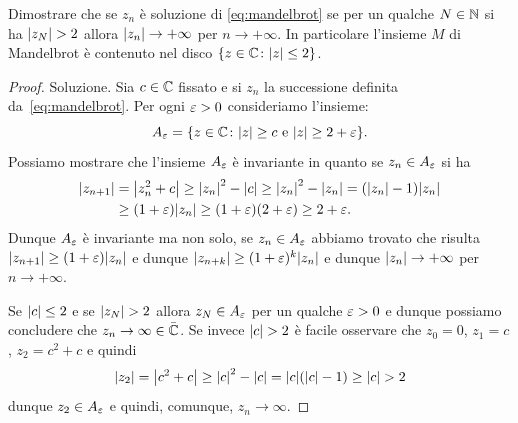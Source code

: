 \begin{exercise}
Dimostrare che se $z_n$ è soluzione di \eqref{eq:mandelbrot}
se per un qualche $N\in \mathbb N$ si ha ${\left|z_N\right|}> 2$ allora ${\left|z_n\right|}\to +\infty$
per $n\to +\infty$. In particolare l'insieme $M$ di Mandelbrot
è contenuto nel disco ${\left\{ z\in \mathbb C \colon {\left|z\right|}\le 2 \right\}}$.
\end{exercise}
%
\begin{proof}{Soluzione.}
Sia $c\in \mathbb C$ fissato e si $z_n$ la successione definita da~\eqref{eq:mandelbrot}.
Per ogni $\varepsilon>0$ consideriamo l'insieme:
\[
  A_\varepsilon = {\left\{ z \in \mathbb C \colon {\left|z\right|}\ge c \text{ e } {\left|z\right|}\ge 2+\varepsilon \right\}}.
\]
Possiamo mostrare che l'insieme $A_\varepsilon$ è invariante in quanto se $z_n\in A_\varepsilon$
si ha
\begin{equation}\label{eq:473244}
\begin{aligned}
{\left|z_{n+1}\right|}
&= {\left|z_n^2+c\right|}
\ge {\left|z_n\right|}^2 - {\left|c\right|}
\ge {\left|z_n\right|}^2 - {\left|z_n\right|}
= ({\left|z_n\right|}-1){\left|z_n\right|}\\
&\ge (1+\varepsilon){\left|z_n\right|}
\ge (1+\varepsilon)(2+\varepsilon)
\ge 2+\varepsilon.
\end{aligned}
\end{equation}
Dunque $A_\varepsilon$ è invariante ma non solo, se $z_n \in A_\varepsilon$ abbiamo
trovato che risulta ${\left|z_{n+1}\right|} \ge (1+\varepsilon) {\left|z_n\right|}$
e dunque ${\left|z_{n+k}\right|} \ge (1+\varepsilon)^k {\left|z_n\right|}$ e dunque
${\left|z_n\right|}\to +\infty$ per $n\to +\infty$.

Se ${\left|c\right|}\le 2$ e se ${\left|z_N\right|}> 2$ allora $z_N \in A_\varepsilon$ per
un qualche $\varepsilon>0$ e dunque possiamo concludere che
$z_n\to \infty\in \bar {\mathbb C}$.
Se invece ${\left|c\right|}>2$ è facile osservare che $z_0 = 0$, $z_1=c$, $z_2=c^2+c$
e quindi
\[
  {\left|z_2\right|}
    = {\left|c^2+c\right|}
    \ge {\left|c\right|}^2 - {\left|c\right|}
    = {\left|c\right|}({\left|c\right|}-1)
    \ge {\left|c\right|} > 2
\]
dunque $z_2 \in A_\varepsilon$ e quindi, comunque, $z_n\to \infty$.

\end{proof}
